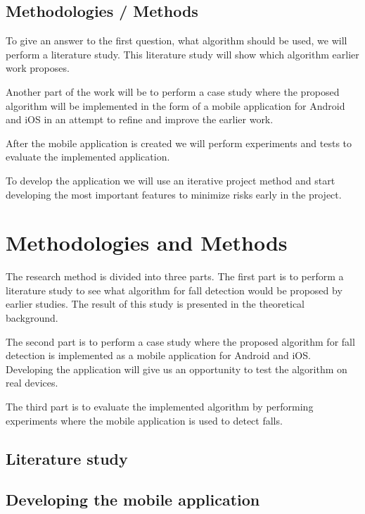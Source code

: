 \documentclass[11pt, a4paper, onecolumn]{article}
\begin{document}
	
	\tableofcontents
	\newpage
	
\subsection{Methodologies / Methods}

To give an answer to the first question, what algorithm should be used, we will perform a literature study. This literature study will show which algorithm earlier work proposes.

Another part of the work will be to perform a case study where the proposed algorithm will be implemented in the form of a mobile application for Android and iOS in an attempt to refine and improve the earlier work.

After the mobile application is created we will perform experiments and tests to evaluate the implemented application.

To develop the application we will use an iterative project method and start developing the most important features to minimize risks early in the project. 

\section{Methodologies and Methods}

The research method is divided into three parts. The first part is to perform a literature study to see what algorithm for fall detection would be proposed by earlier studies. The result of this study is presented in the theoretical background.

The second part is to perform a case study where the proposed algorithm for fall detection is implemented as a mobile application for Android and iOS. Developing the application will give us an opportunity to test the algorithm on real devices.

The third part is to evaluate the implemented algorithm by performing experiments where the mobile application is used to detect falls.

\subsection{Literature study}

\subsection{Developing the mobile application}
\end{document}
